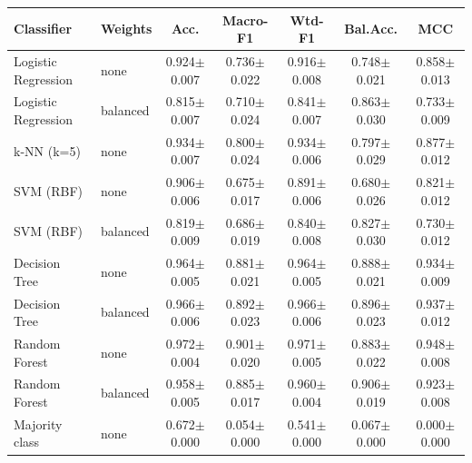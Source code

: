 \begin{tabular}{llccccc}
\toprule
Classifier & Weights & Acc. & Macro-F1 & Wtd-F1 & Bal.Acc. & MCC \\
\midrule
Logistic Regression & none & 0.924$\pm$0.007 & 0.736$\pm$0.022 & 0.916$\pm$0.008 & 0.748$\pm$0.021 & 0.858$\pm$0.013 \\
Logistic Regression & balanced & 0.815$\pm$0.007 & 0.710$\pm$0.024 & 0.841$\pm$0.007 & 0.863$\pm$0.030 & 0.733$\pm$0.009 \\
k-NN (k=5) & none & 0.934$\pm$0.007 & 0.800$\pm$0.024 & 0.934$\pm$0.006 & 0.797$\pm$0.029 & 0.877$\pm$0.012 \\
SVM (RBF) & none & 0.906$\pm$0.006 & 0.675$\pm$0.017 & 0.891$\pm$0.006 & 0.680$\pm$0.026 & 0.821$\pm$0.012 \\
SVM (RBF) & balanced & 0.819$\pm$0.009 & 0.686$\pm$0.019 & 0.840$\pm$0.008 & 0.827$\pm$0.030 & 0.730$\pm$0.012 \\
Decision Tree & none & 0.964$\pm$0.005 & 0.881$\pm$0.021 & 0.964$\pm$0.005 & 0.888$\pm$0.021 & 0.934$\pm$0.009 \\
Decision Tree & balanced & 0.966$\pm$0.006 & 0.892$\pm$0.023 & 0.966$\pm$0.006 & 0.896$\pm$0.023 & 0.937$\pm$0.012 \\
Random Forest & none & 0.972$\pm$0.004 & 0.901$\pm$0.020 & 0.971$\pm$0.005 & 0.883$\pm$0.022 & 0.948$\pm$0.008 \\
Random Forest & balanced & 0.958$\pm$0.005 & 0.885$\pm$0.017 & 0.960$\pm$0.004 & 0.906$\pm$0.019 & 0.923$\pm$0.008 \\
Majority class & none & 0.672$\pm$0.000 & 0.054$\pm$0.000 & 0.541$\pm$0.000 & 0.067$\pm$0.000 & 0.000$\pm$0.000 \\
\bottomrule
\end{tabular}
